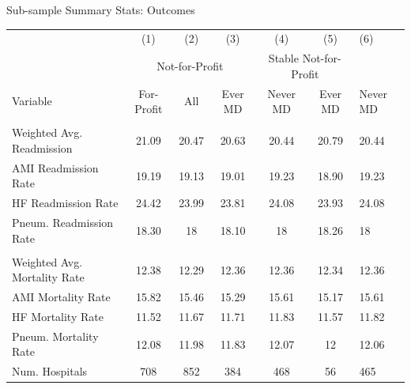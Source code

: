 \documentclass[notes,11pt, aspectratio=169]{beamer}
\begin{document}
\begin{frame}[noframenumbering]{Sub-sample Summary Stats: Outcomes}
    \begin{table}[ht!]
    \footnotesize
\centering
\begin{tabular}[t]{lcccccl}
\toprule
 & (1) & (2) & (3) & (4) & (5) & (6)\\
\addlinespace[0.3em]
\multicolumn{2}{c}{ } & \multicolumn{3}{c}{Not-for-Profit} & \multicolumn{2}{c}{Stable Not-for-Profit} \\
\cmidrule(l{3pt}r{3pt}){3-5} \cmidrule(l{3pt}r{3pt}){6-7}
Variable & For-Profit & All & Ever MD & Never MD & Ever MD & Never MD\\
\midrule
\addlinespace[0.3em]
\multicolumn{7}{l}{\textbf{Readmission Outcome Variables}}\\
\hspace{1em}Weighted Avg. Readmission & 21.09 & 20.47 & 20.63 & 20.44 & 20.79 & 20.44\\
\hspace{1em}AMI Readmission Rate & 19.19 & 19.13 & 19.01 & 19.23 & 18.90 & 19.23\\
\hspace{1em}HF Readmission Rate & 24.42 & 23.99 & 23.81 & 24.08 & 23.93 & 24.08\\
\hspace{1em}Pneum. Readmission Rate & 18.30 & 18 & 18.10 & 18 & 18.26 & 18\\
\addlinespace[0.3em]
\multicolumn{7}{l}{\textbf{Mortality Outcome Variables}}\\
\hspace{1em}Weighted Avg. Mortality Rate & 12.38 & 12.29 & 12.36 & 12.36 & 12.34 & 12.36\\
\hspace{1em}AMI Mortality Rate & 15.82 & 15.46 & 15.29 & 15.61 & 15.17 & 15.61\\
\hspace{1em}HF Mortality Rate & 11.52 & 11.67 & 11.71 & 11.83 & 11.57 & 11.82\\
\hspace{1em}Pneum. Mortality Rate & 12.08 & 11.98 & 11.83 & 12.07 & 12 & 12.06\\
\addlinespace[0.3em]
Num. Hospitals & 708 & 852 & 384 & 468 & 56 & 465\\
\bottomrule
\end{tabular}
\end{table}
\end{frame}
\end{document}

